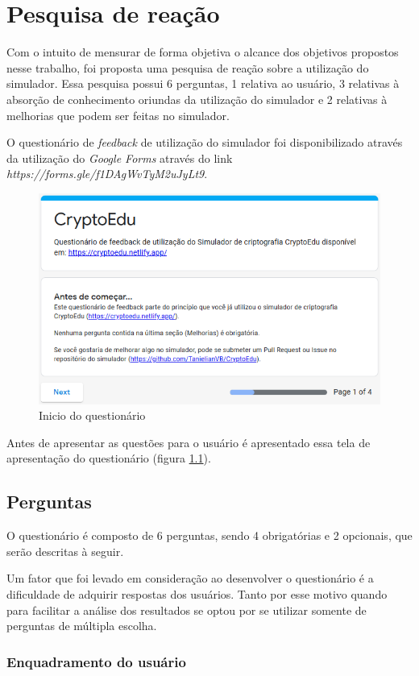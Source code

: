 \chapter{Pesquisa de reação}
\label{char:pesquisa}
Com o intuito de mensurar de forma objetiva o alcance dos objetivos propostos nesse trabalho, foi proposta uma pesquisa de reação sobre a utilização do simulador. Essa pesquisa possui 6 perguntas, 1 relativa ao usuário, 3 relativas à absorção de conhecimento oriundas da utilização do simulador e 2 relativas à melhorias que podem ser feitas no simulador.

O questionário de \textit{feedback} de utilização do simulador foi disponibilizado através da utilização do \textit{Google Forms} através do link \textit{https://forms.gle/f1DAgWvTyM2uJyLt9}.

\begin{figure}[H]
    \centering
    \caption{Inicio do questionário}
    \label{fig:inicioquestionario}
    \includegraphics[width=0.75\linewidth]{Questionario/QI.png}
\end{figure}

Antes de apresentar as questões para o usuário é apresentado essa tela de apresentação do questionário (figura \ref{fig:inicioquestionario}).

\section{Perguntas}
O questionário é composto de 6 perguntas, sendo 4 obrigatórias e 2 opcionais, que serão descritas à seguir.

Um fator que foi levado em consideração ao desenvolver o  questionário é a dificuldade de adquirir respostas dos usuários. Tanto por esse motivo quando para facilitar a análise dos resultados se optou por se utilizar somente de perguntas de múltipla escolha.

\subsection{Enquadramento do usuário}

